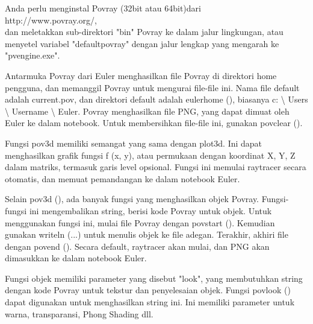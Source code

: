 \documentclass[a4paper,10pt]{article}
\begin{document}
\begin{eulernotebook}
\begin{eulercomment}
\begin{eulercomment}
\begin{eulercomment}
Anda perlu menginstal Povray (32bit atau 64bit)dari\\
http://www.povray.org/,\\
dan meletakkan sub-direktori "bin" Povray ke dalam jalur lingkungan,
atau menyetel variabel "defaultpovray" dengan jalur lengkap yang
mengarah ke "pvengine.exe".

Antarmuka Povray dari Euler menghasilkan file Povray di direktori home
pengguna, dan memanggil Povray untuk mengurai file-file ini. Nama file
default adalah current.pov, dan direktori default adalah eulerhome (),
biasanya c: \textbackslash{} Users \textbackslash{} Username \textbackslash{} Euler. Povray menghasilkan file PNG,
yang dapat dimuat oleh Euler ke dalam notebook. Untuk membersihkan
file-file ini, gunakan povclear ().

Fungsi pov3d memiliki semangat yang sama dengan plot3d. Ini dapat
menghasilkan grafik fungsi f (x, y), atau permukaan dengan koordinat
X, Y, Z dalam matriks, termasuk garis level opsional. Fungsi ini
memulai raytracer secara otomatis, dan memuat pemandangan ke dalam
notebook Euler.

Selain pov3d (), ada banyak fungsi yang menghasilkan objek Povray.
Fungsi-fungsi ini mengembalikan string, berisi kode Povray untuk
objek. Untuk menggunakan fungsi ini, mulai file Povray dengan povstart
(). Kemudian gunakan writeln (...) untuk menulis objek ke file adegan.
Terakhir, akhiri file dengan povend (). Secara default, raytracer akan
mulai, dan PNG akan dimasukkan ke dalam notebook Euler.

Fungsi objek memiliki parameter yang disebut "look", yang membutuhkan
string dengan kode Povray untuk tekstur dan penyelesaian objek. Fungsi
povlook () dapat digunakan untuk menghasilkan string ini. Ini memiliki
parameter untuk warna, transparansi, Phong Shading dll.


\end{eulercomment}
\end{eulercomment}
\end{eulercomment}
\end{eulernotebook}
\end{document}
